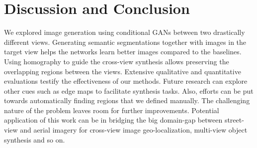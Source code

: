 \documentclass[times,twocolumn,final,authoryear]{elsarticle_modified}
\begin{document}
											










































 \vspace{-5pt}
\section{Discussion and Conclusion}  
\label{sec:conclusion}
We explored image generation using conditional GANs between two drastically different views. Generating semantic segmentations together with images in the target view helps the networks learn better images compared to the baselines. Using homography to guide the cross-view synthesis allows preserving the overlapping regions between the views. Extensive qualitative and quantitative evaluations testify the effectiveness of our methods. Future research can explore other cues such as edge maps to facilitate synthesis tasks. Also, efforts can be put towards automatically finding regions that we defined manually. The challenging nature of the problem leaves room for further improvements. Potential application of this work can be in bridging the big domain-gap between street-view and aerial imagery for cross-view image geo-localization, multi-view object synthesis and so on. 
 



\end{document}
